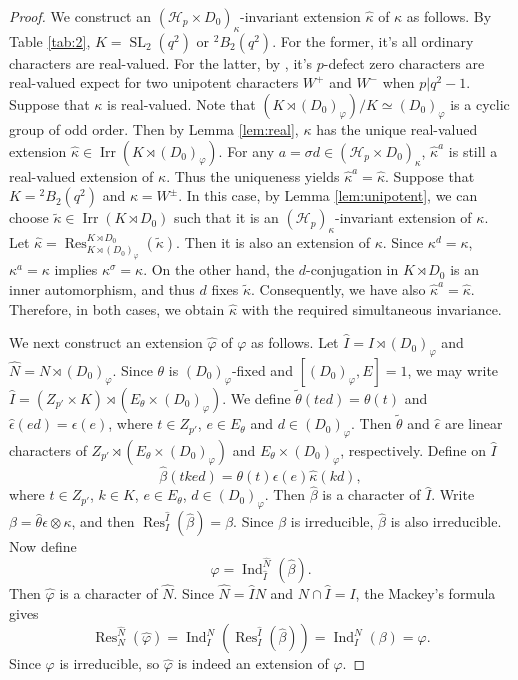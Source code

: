 \documentclass[11pt,a4paper]{article}
\numberwithin{equation}{section}
\theoremstyle{definition}
\theoremstyle{remark}
\newcommand{\Irr}{\operatorname{Irr}}
\newcommand{\SL}{\operatorname{SL}}
\newcommand{\HH}{\mathcal H}
\newcommand{\Ind}{\operatorname{Ind}}
\begin{document}
\begin{proof}
We construct an $(\HH_p\times D_0)_\kappa$-invariant extension $\widehat \kappa$ of $\kappa$ as follows.  By Table \ref{tab:2}, $K=\SL_2(q^2)$ or ${}^2B_2(q^2)$. For the former, it's all ordinary characters are real-valued. 
For the latter, by \cite[p.71 and Table 4.2.1]{S16}, it's $p$-defect zero characters are real-valued expect for two unipotent characters $W^{+}$ and $W^{-}$ when $p|q^2-1$.
Suppose that $\kappa$ is real-valued. Note that $(K\rtimes (D_0)_\varphi)/K\simeq (D_0)_\varphi$ is a cyclic group of odd order. Then by Lemma \ref{lem:real}, $\kappa$ has the unique real-valued extension $\widehat{\kappa}\in\Irr(K\rtimes (D_0)_\varphi)$. For any $a=\sigma d\in(\HH_p\times D_0)_\kappa$, \(\widehat\kappa^{a}\) is still a real-valued extension of \(\kappa\). Thus the uniqueness yields
$\widehat\kappa^{a}=\widehat\kappa$. Suppose that $K={}^2B_2(q^2)$ and $\kappa=W^{\pm}$. In this case, by Lemma \ref{lem:unipotent}, we can choose $\widetilde\kappa\in\Irr(K\rtimes D_0)$ such that it is an \((\HH_p)_\kappa\)-invariant extension of \(\kappa\). Let $\widehat\kappa=\operatorname{Res}^{K\rtimes D_0}_{K\rtimes  (D_0)_\varphi}(\widetilde\kappa)$. Then it is also an extension of \(\kappa\). Since $\kappa^d=\kappa$,
$\kappa^{a}=\kappa$ implies \(\kappa^\sigma=\kappa\).
On the other hand, the $d$-conjugation in \(K\rtimes D_0\) is an inner automorphism, and thus $d$ fixes \(\widetilde\kappa\). Consequently, we have also $\widehat\kappa^{a}=\widehat\kappa$. Therefore, in both cases, we obtain \(\widehat\kappa\) with the required simultaneous invariance.

We next construct an extension $\widehat \varphi$ of $\varphi$ as follows. Let $\widehat I=I\rtimes (D_0)_\varphi$ and $\widehat N=N\rtimes (D_0)_\varphi$. Since $\theta$ is $(D_0)_\varphi$-fixed and $[(D_0)_\varphi,E]=1$, we may write $\widehat I=(Z_{p'}\times K)\rtimes (E_\theta \times (D_0)_\varphi)$. 
We define  $\widetilde{\theta}(ted)=\theta(t)$ and 
$\widehat{\epsilon}(ed)=\epsilon(e)$, where 
$t\in Z_{p'}$, $e\in E_\theta$ and $d\in (D_0)_\varphi$.
Then $\widetilde \theta$ and $\widehat \epsilon$ are linear characters of $Z_{p'}\rtimes(E_\theta\times (D_0)_\varphi)$ and  $E_\theta\times (D_0)_\varphi$, respectively.
Define on $\widehat I$ 
\[
\widehat\beta(tked)=\theta(t)\epsilon(e)\widehat\kappa(kd),
\]
where $t\in Z_{p'}$, $k\in K$, $e\in E_\theta$, $d\in (D_0)_\varphi$.
Then  $\widehat\beta$ is a character of $\widehat I$.
Write $\beta=\widehat \theta\epsilon\otimes \kappa$,
and then $\operatorname{Res}_{I}^
{\widehat I}(\widehat\beta)=\beta$. Since $\beta$ is irreducible, $\widehat\beta$ is also irreducible. Now define
\[
\widehat\varphi=\operatorname{Ind}_{\widehat I}^{\widehat N}(\widehat\beta).
\]
Then $\widehat\varphi$ is a character of $\widehat N$.
Since $\widehat N=\widehat IN$ and $N\cap \widehat I=I$, 
the Mackey's formula gives
\[
\operatorname{Res}_{N}^{\widehat N}(\widehat\varphi)=\Ind_{I}^{N}(\operatorname{Res}_{I}^
{\widehat I}(\widehat\beta))=\Ind_{I}^{N}(\beta)=\varphi.
\]
Since $\varphi$ is irreducible, so $\widehat \varphi$  is indeed an extension of $\varphi$.


\end{proof}
\end{document}

